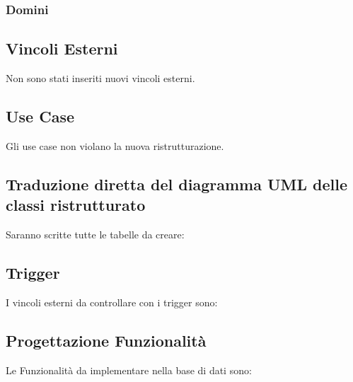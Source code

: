 \documentclass[12pt, letterpaper]{article}
\begin{document}
\subsubsection{Domini}

\subsection{Vincoli Esterni}
Non sono stati inseriti nuovi vincoli esterni.
\subsection{Use Case}
Gli use case non violano la nuova ristrutturazione.
\newpage
\subsection{Traduzione diretta del diagramma UML delle classi ristrutturato}
Saranno scritte tutte le tabelle da creare:\\

\newpage \subsection{Trigger}
I vincoli esterni da controllare con i trigger sono:\\

\newpage \subsection{Progettazione Funzionalità}
Le Funzionalità da implementare nella base di dati sono:\\
\end{document}
